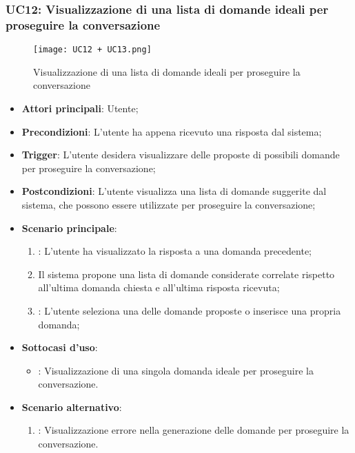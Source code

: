 \newpage

\hypertarget{UC12}{}
\subsubsection{UC12: Visualizzazione di una lista di domande ideali per proseguire la conversazione}

\begin{figure}[h]
    \centering
    \texttt{[image: UC12 + UC13.png]}
    \caption{Visualizzazione di una lista di domande ideali per proseguire la conversazione}
\end{figure}

\begin{itemize}
    \item \textbf{Attori principali}: Utente;
    \item \textbf{Precondizioni}: L'utente ha appena ricevuto una risposta dal sistema;
    \item \textbf{Trigger}: L'utente desidera visualizzare delle proposte di possibili domande per proseguire la conversazione;
    \item \textbf{Postcondizioni}: L'utente visualizza una lista di domande suggerite dal sistema, che possono essere utilizzate per proseguire la conversazione;
    \item \textbf{Scenario principale}:
    \begin{enumerate}
        \item {}: L'utente ha visualizzato la risposta a una domanda precedente;
        \item Il sistema propone una lista di domande considerate correlate rispetto all'ultima domanda chiesta
        e all'ultima risposta ricevuta;
        \item {}: L'utente seleziona una delle domande proposte o inserisce una propria domanda;
    \end{enumerate}
    \item \textbf{Sottocasi d'uso}:
    \begin{itemize}
        \item {}: Visualizzazione di una singola domanda ideale per proseguire la conversazione.
    \end{itemize}
    \item \textbf{Scenario alternativo}:
    \begin{enumerate}
        \item {}: Visualizzazione errore nella generazione delle domande per proseguire la conversazione.
    \end{enumerate}
\end{itemize}

